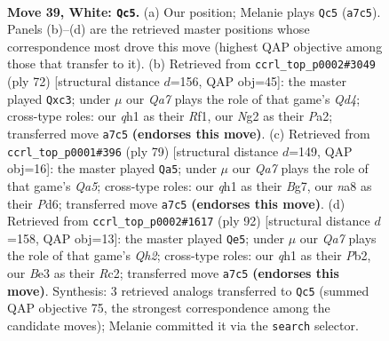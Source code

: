 \documentclass[11pt]{article}
\begin{document}
\clearpage

\begin{figure}[p]\centering
\begin{subfigure}{0.46\textwidth}\centering
\resizebox{\linewidth}{!}{%
\newchessgame
\chessboard[
  setfen={nr4k1/Qr3pb1/R7/4p3/4P3/4Bn2/3NKRN1/7q w - - 2 39},
  showmover=false,
  pgfstyle=straightmove, color=movearrow, markmove={a7-c5}
]}
\caption{}
\end{subfigure}\hfill
\begin{subfigure}{0.46\textwidth}\centering
\resizebox{\linewidth}{!}{%
\newchessgame
\chessboard[
  setfen={6k1/2r1rp1p/6p1/4n3/3Q4/1Pq5/P5BP/3R1R1K w - - 0 37},
  showmover=false,
  pgfstyle=straightmove, color=movearrow, markmove={d4-c3}
]}
\caption{}
\end{subfigure}
\\[4pt]
\begin{subfigure}{0.46\textwidth}\centering
\resizebox{\linewidth}{!}{%
\newchessgame
\chessboard[
  setfen={5r1k/r5bp/2Rp2p1/3Pp3/q2nN3/8/5PPP/1Q1B1RK1 b - - 22 40},
  showmover=false,
  pgfstyle=straightmove, color=movearrow, markmove={a4-a5}
]}
\caption{}
\end{subfigure}\hfill
\begin{subfigure}{0.46\textwidth}\centering
\resizebox{\linewidth}{!}{%
\newchessgame
\chessboard[
  setfen={5qk1/8/p2rb1p1/3N2pn/2B1P3/8/1PR4Q/1K6 w - - 5 47},
  showmover=false,
  pgfstyle=straightmove, color=movearrow, markmove={h2-e5}
]}
\caption{}
\end{subfigure}
\caption{\textbf{Move 39, White: \texttt{Qc5}.} (a) Our position; Melanie plays \texttt{Qc5} (\texttt{a7c5}). Panels (b)--(d) are the retrieved master positions whose correspondence most drove this move (highest QAP objective among those that transfer to it). (b) Retrieved from \texttt{ccrl\_top\_p0002\#3049} (ply 72) [structural distance $d$=156, QAP obj=45]: the master played \texttt{Qxc3}; under $\mu$ our \emph{Qa7} plays the role of that game's \emph{Qd4}; cross-type roles: our \emph{q}h1 as their \emph{R}f1, our \emph{N}g2 as their \emph{P}a2; transferred move \texttt{a7c5} \textbf{(endorses this move)}. (c) Retrieved from \texttt{ccrl\_top\_p0001\#396} (ply 79) [structural distance $d$=149, QAP obj=16]: the master played \texttt{Qa5}; under $\mu$ our \emph{Qa7} plays the role of that game's \emph{Qa5}; cross-type roles: our \emph{q}h1 as their \emph{B}g7, our \emph{n}a8 as their \emph{P}d6; transferred move \texttt{a7c5} \textbf{(endorses this move)}. (d) Retrieved from \texttt{ccrl\_top\_p0002\#1617} (ply 92) [structural distance $d$=158, QAP obj=13]: the master played \texttt{Qe5}; under $\mu$ our \emph{Qa7} plays the role of that game's \emph{Qh2}; cross-type roles: our \emph{q}h1 as their \emph{P}b2, our \emph{B}e3 as their \emph{R}c2; transferred move \texttt{a7c5} \textbf{(endorses this move)}. Synthesis: 3 retrieved analogs transferred to \texttt{Qc5} (summed QAP objective 75, the strongest correspondence among the candidate moves); Melanie committed it via the \texttt{search} selector.}
\label{fig:thought-m76}
\end{figure}
\end{document}
